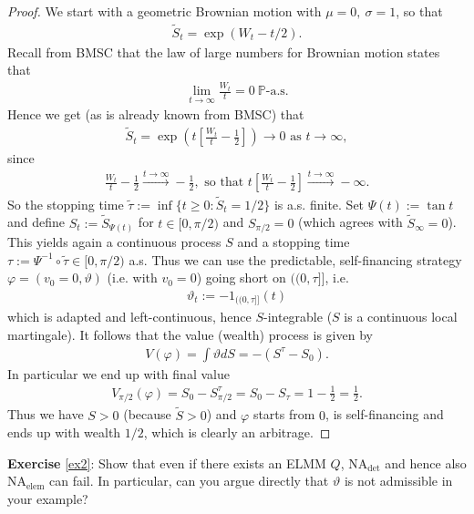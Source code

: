 \documentclass[12pt,a4paper, twoside]{article}
\theoremstyle{definition}
\newcommand{\PP}{\mathbb{P}} %
\begin{document}
\begin{proof}
We start with a geometric Brownian motion with $\mu=0, \ \sigma=1$, so that \begin{align*}
\widetilde{S}_t= \exp \left( W_t - t/2\right).
\end{align*}
Recall from BMSC that the law of large numbers for Brownian motion states that 
\begin{align*}
\lim_{t \to \infty} \frac{W_t}{t}=0 \ \PP\text{-a.s.}
\end{align*}
Hence we get (as is already known from BMSC) that
\begin{align*}
\widetilde{S}_t = \exp \left( t \left[ \frac{W_t}{t}- \frac{1}{2}\right] \right) \to 0 \text{ as } t \to \infty,
\end{align*}
since
\begin{align*}
\frac{W_t}{t}- \frac{1}{2} \xrightarrow{t \to \infty} - \frac{1}{2}, \text{ so that } t \left[ \frac{W_t}{t} - \frac{1}{2}\right] \xrightarrow{ t \to \infty} - \infty.
\end{align*}
So the stopping time $ \widetilde{\tau} := \inf\{ t \geq 0 : \widetilde{S}_t = 1/2\}$ is a.s. finite. Set $\Psi(t):= \tan t$ and define $S_t:= \widetilde{S}_{ \Psi (t)}$ for $t \in [0, \pi/2)$ and $S_{ \pi/2} =0$ (which agrees with $\widetilde{S}_\infty =0$). This yields again a continuous process $S$ and a stopping time $\tau := \Psi^{-1}\circ \widetilde{\tau} \in [0, \pi/2)$ a.s. Thus we can use the predictable, self-financing strategy $\varphi = (v_0=0, \vartheta)$  (i.e. with $v_0=0$) going short on $(\!(0, \tau ]\!]$,  i.e.  \begin{align*}
\vartheta_t := - 1_{(\!( 0, \tau]\!]} (t)
\end{align*}
which is adapted and left-continuous, hence $S$-integrable ($S$ is a continuous local martingale). It follows that the value (wealth) process is given by
\begin{align*}
V( \varphi)= \int \vartheta dS = -(S^\tau - S_0).
\end{align*}
In particular we end up with final value
\begin{align*}
V_{ \pi/2} ( \varphi)= S_0 - S_{ \pi/2}^\tau = S_0 -S_\tau = 1- \frac{1}{2}= \frac{1}{2}.
\end{align*}
Thus we have $S >0$ (because $\widetilde{S} >0$)  and $\varphi$ starts from $0$, is self-financing and ends up with wealth $1/2$, which is clearly an  arbitrage.
\end{proof}
\newpage
\noindent \textbf{Exercise} \ref{ex2}: Show that even if there exists an ELMM $Q$, NA$_\text{det}$ and hence also NA$_\text{elem}$ can fail. In particular, can you argue directly that $\vartheta$ is not admissible in your example?
\end{document}
